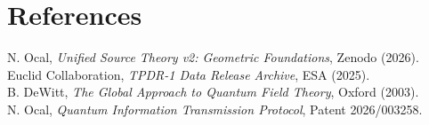 \documentclass[11pt,a4paper]{article}
\begin{document}
\section*{References}
\small
\noindent [1] N. Ocal, \textit{Unified Source Theory v2: Geometric Foundations}, Zenodo (2026). \\
\noindent [2] Euclid Collaboration, \textit{TPDR-1 Data Release Archive}, ESA (2025). \\
\noindent [3] B. DeWitt, \textit{The Global Approach to Quantum Field Theory}, Oxford (2003). \\
\noindent [4] N. Ocal, \textit{Quantum Information Transmission Protocol}, Patent 2026/003258.
\end{document}
